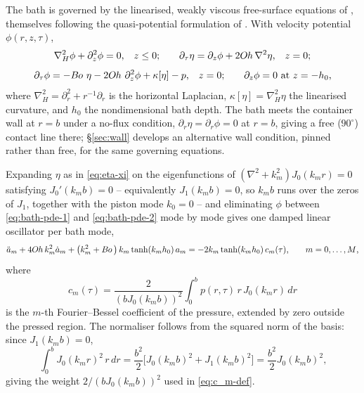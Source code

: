 The bath is governed by the linearised, weakly viscous free-surface equations of \cite{AlventosaEtAl2023}, themselves following the quasi-potential formulation of \cite{DiasEtAl2008}. With velocity potential $\phi(r,z,\tau)$,
\begin{equation}
    \nabla_H^2\phi+\partial_z^2\phi=0\text{,}\quad z\le0\text{;}\qquad
    \partial_\tau\eta = \partial_z\phi+2O\kern-0.04em h\,\nabla^2\eta\text{,}\quad z=0\text{;}
    \label{eq:bath-pde-1}
\end{equation}
\begin{equation}
    \partial_\tau\phi = -B\kern-0.04em o\,\,\eta - 2O\kern-0.04em h\,\,\partial_z^2\phi + \kappa[\eta] - p\text{,}\quad z=0\text{;}\qquad
    \partial_z\phi=0\text{ at }z=-h_0\text{,}
    \label{eq:bath-pde-2}
\end{equation}
where $\nabla_H^2=\partial_r^2+r^{-1}\partial_r$ is the horizontal Laplacian, $\kappa[\eta]=\nabla_H^2\eta$ the linearised curvature, and $h_0$ the nondimensional bath depth. The bath meets the container wall at $r=b$ under a no-flux condition, $\partial_r\eta=\partial_r\phi=0$ at $r=b$, giving a free ($90^\circ$) contact line there; \S\ref{sec:wall} develops an alternative wall condition, pinned rather than free, for the same governing equations.

Expanding $\eta$ as in \eqref{eq:eta-xi} on the eigenfunctions of $(\nabla^2+k_m^2)J_0(k_mr)=0$ satisfying $J_0'(k_mb)=0$ -- equivalently $J_1(k_mb)=0$, so $k_mb$ runs over the zeros of $J_1$, together with the piston mode $k_0=0$ -- and eliminating $\phi$ between \eqref{eq:bath-pde-1} and \eqref{eq:bath-pde-2} mode by mode gives one damped linear oscillator per bath mode,
\begin{equation}
    \ddot a_m + 4O\kern-0.04em h\, k_m^2 \dot a_m + \left(k_m^2+B\kern-0.04em o\,\right)k_m\tanh(k_m h_0)\, a_m = -2 k_m \tanh(k_m h_0)\, c_m(\tau)\text{,}\qquad m=0,\dots,M\text{,}
    \label{eq:bath-mode}
\end{equation}
where
\begin{equation}
    c_m(\tau) = \frac{2}{(bJ_0(k_mb))^2}\int_0^b p(r,\tau)\,r\,J_0(k_mr)\,dr
    \label{eq:c_m-def}
\end{equation}
is the $m$-th Fourier--Bessel coefficient of the pressure, extended by zero outside the pressed region. The normaliser follows from the squared norm of the basis: since $J_1(k_mb)=0$,
\begin{equation}
    \int_0^bJ_0(k_mr)^2\,r\,dr = \frac{b^2}{2}\Big[J_0(k_mb)^2+J_1(k_mb)^2\Big] = \frac{b^2}{2}J_0(k_mb)^2\text{,}
    \label{eq:bessel-norm}
\end{equation}
giving the weight $2/(bJ_0(k_mb))^2$ used in \eqref{eq:c_m-def}.

